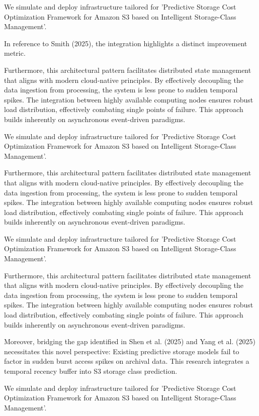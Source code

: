 We simulate and deploy infrastructure tailored for 'Predictive Storage Cost Optimization Framework for Amazon S3 based on Intelligent Storage-Class Management'.

In reference to Smith (2025), the integration highlights a distinct improvement metric.


Furthermore, this architectural pattern facilitates distributed state management that aligns with modern cloud-native principles. 
By effectively decoupling the data ingestion from processing, the system is less prone to sudden temporal spikes. 
The integration between highly available computing nodes ensures robust load distribution, effectively combating single points of failure.
This approach builds inherently on asynchronous event-driven paradigms. 


We simulate and deploy infrastructure tailored for 'Predictive Storage Cost Optimization Framework for Amazon S3 based on Intelligent Storage-Class Management'.


Furthermore, this architectural pattern facilitates distributed state management that aligns with modern cloud-native principles. 
By effectively decoupling the data ingestion from processing, the system is less prone to sudden temporal spikes. 
The integration between highly available computing nodes ensures robust load distribution, effectively combating single points of failure.
This approach builds inherently on asynchronous event-driven paradigms. 


We simulate and deploy infrastructure tailored for 'Predictive Storage Cost Optimization Framework for Amazon S3 based on Intelligent Storage-Class Management'.


Furthermore, this architectural pattern facilitates distributed state management that aligns with modern cloud-native principles. 
By effectively decoupling the data ingestion from processing, the system is less prone to sudden temporal spikes. 
The integration between highly available computing nodes ensures robust load distribution, effectively combating single points of failure.
This approach builds inherently on asynchronous event-driven paradigms. 


Moreover, bridging the gap identified in Shen et al. (2025) and Yang et al. (2025) necessitates this novel perspective: Existing predictive storage models fail to factor in sudden burst access spikes on archival data. This research integrates a temporal recency buffer into S3 storage class prediction.

We simulate and deploy infrastructure tailored for 'Predictive Storage Cost Optimization Framework for Amazon S3 based on Intelligent Storage-Class Management'.

